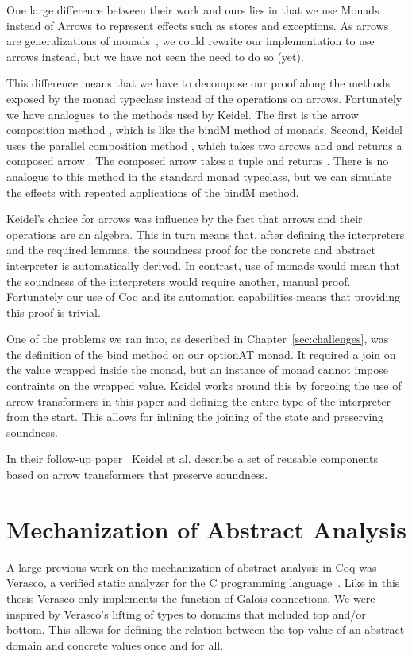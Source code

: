 One large difference between their work and ours
lies in that we use Monads instead of Arrows to represent 
effects such as stores and exceptions. As
arrows are generalizations of monads~\cite{hughes2000generalising}, we could
rewrite our implementation to use arrows instead, but we have not seen the need
to do so (yet). 

This difference means that we have to decompose our proof along the methods
exposed by the monad typeclass instead of the operations on arrows. Fortunately
we have analogues to the methods used by Keidel. The first is the arrow
composition method \coq{>>> }, which is like the bindM method of monads.  Second,
Keidel uses the parallel composition method \coq{*** }, which takes two arrows 
 and  and
returns a composed arrow . The composed arrow takes a tuple 
and returns . There is no analogue to this method in the standard
monad typeclass, but we can simulate the effects with repeated applications of
the bindM method.

Keidel's choice for arrows was influence by the fact that arrows and their
operations are an algebra. This in turn means that, after defining the
interpreters and the required lemmas, the soundness proof for the concrete and
abstract interpreter is automatically derived. In contrast, use of monads would
mean that the soundness of the interpreters would require another, manual
proof. Fortunately our use of Coq and its automation capabilities means that
providing this proof is trivial.

One of the problems we ran into, as described in Chapter~\ref{sec:challenges},
was the definition of the bind method on our optionAT monad. It required a join
on the value wrapped inside the monad, but an instance of monad cannot impose
contraints on the wrapped value. Keidel works around this by forgoing the use
of arrow transformers in this paper and defining the entire type of the
interpreter from the start. This allows for inlining the joining of the state
and preserving soundness.

In their follow-up paper~\cite{keidel2019sound} Keidel et al. describe a set of
reusable components based on arrow transformers that preserve soundness.

\section{Mechanization of Abstract Analysis}
A large previous work on the mechanization of abstract analysis in Coq was
Verasco, a verified static analyzer for the C programming
language~\cite{jourdan2016verasco}. Like in
this thesis Verasco only implements the  function of Galois
connections. We were inspired by Verasco's lifting of types to domains that
included top and/or bottom. This allows for defining the relation between the
top value of an abstract domain and concrete values once and for all. 

